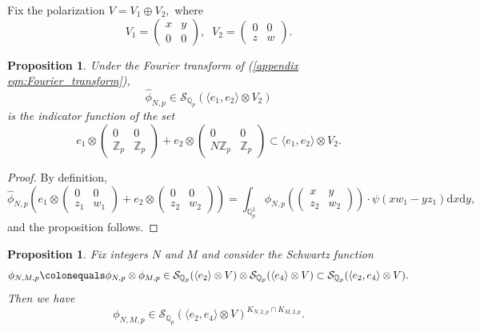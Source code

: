 \documentclass[12pt]{amsart}
\newtheorem{prop}[thm]{Proposition}
\theoremstyle{definition}
\newcommand{\Z}{\mathbb{Z}}
\newcommand{\Q}{\mathbb{Q}}
\renewcommand{\d}{\mathrm{d}}
\begin{document}
Fix the polarization $V = V_1\oplus V_2,$  where
 \begin{equation}\label{eq:isotropic of V}
   V_1 =   \begin{pmatrix}
        x & y\\0 & 0
      \end{pmatrix},\;\; V_2 =\begin{pmatrix}0 & 0\\z & w\end{pmatrix}.
  \end{equation}  
\begin{prop}\label{appendix prop:easy fourier transform}
    Under the Fourier transform of (\ref{appendix eqn:Fourier_transform}), $$\widehat \phi_{N,p} \in \mathcal S_{\Q_p} (\langle e_1,e_2\rangle\otimes V_2)$$
    is the indicator function of the set $$e_1 \otimes \begin{pmatrix} 0 & 0 \\ \Z_p & \Z_p\end{pmatrix}+ e_2\otimes \begin{pmatrix} 0 & 0 \\ N\Z_p & \Z_p\end{pmatrix}\subset \langle e_1,e_2\rangle\otimes V_2.$$
\end{prop}
\begin{proof}
    By definition, $$\widehat\phi_{N,p}\left(e_1 \otimes\begin{pmatrix}
        0 & 0 \\ z_1 & w_1
    \end{pmatrix} + e_2 \otimes\begin{pmatrix}
         0 & 0 \\ z_2 & w_2
    \end{pmatrix}\right) = \int_{\Q_p^2} \phi_{N,p}\left(\begin{pmatrix}
        x & y \\ z_2 & w_2 
    \end{pmatrix}\right) \cdot \psi \left( xw_1 - yz_1\right)\d x\d y, $$
    and the proposition follows. 
\end{proof}
\begin{prop}
    Fix integers $N$ and $M$ and consider the Schwartz function $$\phi_{N,M,p} \colonequals \phi_{N,p}\otimes \phi_{M,p} \in \mathcal S_{\Q_p} (\langle e_2 \rangle\otimes V)\otimes \mathcal S_{\Q_p} (\langle e_4 \rangle\otimes V)\subset \mathcal S_{\Q_p} (\langle e_2,e_4 \rangle\otimes V).$$ Then we have $$\phi_{N,M,p} \in  \mathcal S_{\Q_p} (\langle e_2,e_4 \rangle\otimes V)^{K_{N, 2,p}\cap K_{M,2,p}}.$$
    \end{prop}
\end{document}
